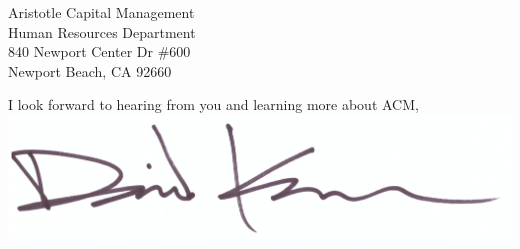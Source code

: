 \documentclass[10pt]{letter}
\begin{document}
\begin{letter}{
  Aristotle Capital Management \\
  Human Resources Department \\
  840 Newport Center Dr \#600 \\
  Newport Beach, CA 92660
}
\closing{
  I look forward to hearing from you and learning more about ACM, \\
  \vspace{.5in}
  \includegraphics[scale=0.4]{signature.png}
}

\end{letter}
\end{document}
